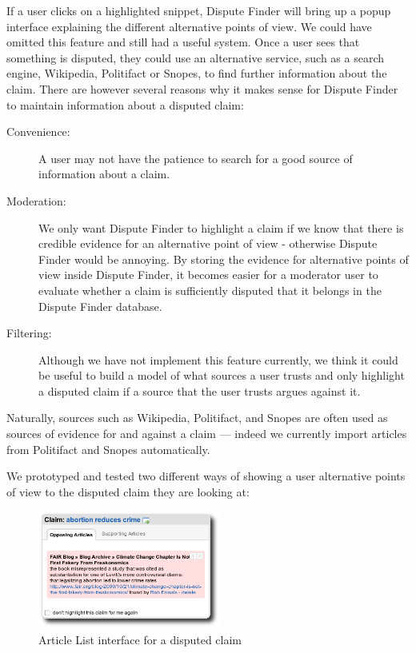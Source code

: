 \documentclass{www2010-submission}
\begin{document}
If a user clicks on a highlighted snippet, Dispute Finder will bring up a popup interface explaining the different alternative points of view. We could have omitted this feature and still had a useful system. Once a user sees that something is disputed, they could use an alternative service, such as a search engine, Wikipedia, Politifact or Snopes, to find further information about the claim. There are however several reasons why it makes sense for Dispute Finder to maintain information about a disputed claim:

\begin{description}
\item[Convenience:] A user may not have the patience to search for a good source of information about a claim. 
\item[Moderation:] We only want Dispute Finder to highlight a claim if we know that there is credible evidence for an alternative point of view - otherwise Dispute Finder would be annoying. By storing the evidence for alternative points of view inside Dispute Finder, it becomes easier for a moderator user to evaluate whether a claim is sufficiently disputed that it belongs in the Dispute Finder database.
\item[Filtering:] Although we have not implement this feature currently, we think it could be useful to build a model of what sources a user trusts and only highlight a disputed claim if a source that the user trusts argues against it.
\end{description}

Naturally, sources such as Wikipedia, Politifact, and Snopes are often used as sources of evidence for and against a claim --- indeed we currently import articles from Politifact and Snopes automatically.

We prototyped and tested two different ways of showing a user alternative points of view to the disputed claim they are looking at:

\begin{figure}[tb]
	\begin{center}
	\includegraphics[width=6cm]{pictures/popup_abortion_shadow.png}
	\caption{Article List interface for a disputed claim}
	\label{article_list}
	\end{center}
\end{figure}
\end{document}
